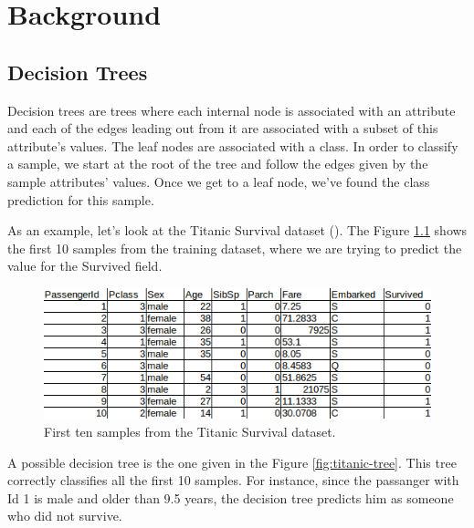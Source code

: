 \newpage

\chapter{Background}
\label{chap:background}

\section{Decision Trees}

Decision trees are trees where each internal node is associated with an attribute and each of the edges leading out from it are associated with a subset of this attribute's values. The leaf nodes are associated with a class. In order to classify a sample, we start at the root of the tree and follow the edges given by the sample attributes' values. Once we get to a leaf node, we've found the class prediction for this sample.

As an example, let's look at the Titanic Survival dataset (\cite{Titanic}). The Figure \ref{fig:titanic-dataset} shows the first 10 samples from the training dataset, where we are trying to predict the value for the Survived field.

\begin{figure}[h]
\includegraphics[width=\textwidth]{titanic}
\caption{First ten samples from the Titanic Survival dataset.}
\label{fig:titanic-dataset}
\end{figure}

A possible decision tree is the one given in the Figure \ref{fig:titanic-tree}. This tree correctly classifies all the first 10 samples. For instance, since the passanger with Id 1 is male and older than 9.5 years, the decision tree predicts him as someone who did not survive.

